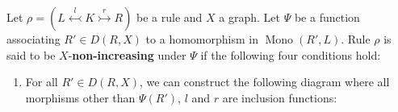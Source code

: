 \begin{definition}
    \label{subgraph_counting:def:creates_more_x_on_the_left}
    Let \(\rho \mathop{=} (L \overset{l}{\leftarrowtail} K \overset{r}{\rightarrowtail} R)\) be a rule and \(X\) a graph. 
    Let \( \Psi \) be a function associating $R' \mathop{\in} D(R,X)$ to a homomorphism in $\operatorname{Mono}(R',L)$.
    Rule $\rho$ is said to be $X$-\textbf{non-increasing} under $\Psi$ 
    if the following four conditions hold:
    \begin{enumerate}
        \item For all $R' \mathop{\in} D(R,X)$, we can construct the following diagram where all morphisms other than $\Psi(R')$, $l$ and $r$ are inclusion functions:
      \begin{center}
\end{center}
\end{enumerate}
\end{definition}
